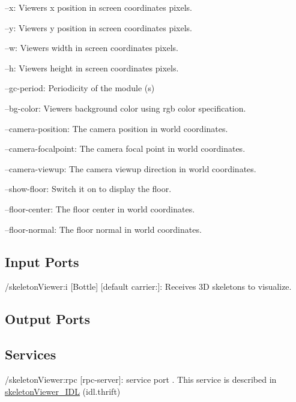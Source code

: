 \begin{DoxyItemize}
\item --x\+: Viewer\textquotesingle{}s x position in screen coordinates pixels.
\item --y\+: Viewer\textquotesingle{}s y position in screen coordinates pixels.
\item --w\+: Viewer\textquotesingle{}s width in screen coordinates pixels.
\item --h\+: Viewer\textquotesingle{}s height in screen coordinates pixels.
\item --gc-\/period\+: Periodicity of the module (s)
\item --bg-\/color\+: Viewer\textquotesingle{}s background color using rgb color specification.
\item --camera-\/position\+: The camera position in world coordinates.
\item --camera-\/focalpoint\+: The camera focal point in world coordinates.
\item --camera-\/viewup\+: The camera viewup direction in world coordinates.
\item --show-\/floor\+: Switch it on to display the floor.
\item --floor-\/center\+: The floor center in world coordinates.
\item --floor-\/normal\+: The floor normal in world coordinates. 
\end{DoxyItemize}\hypertarget{group__skeletonViewer_inputports_sec}{}\subsection{Input Ports}\label{group__skeletonViewer_inputports_sec}

\begin{DoxyItemize}
\item /skeleton\+Viewer\+:i \mbox{[}Bottle\mbox{]} \mbox{[}default carrier\+:\mbox{]}\+: Receives 3D skeletons to visualize.
\end{DoxyItemize}\hypertarget{group__skeletonViewer_outputports_sec}{}\subsection{Output Ports}\label{group__skeletonViewer_outputports_sec}
\hypertarget{group__skeletonViewer_services_sec}{}\subsection{Services}\label{group__skeletonViewer_services_sec}

\begin{DoxyItemize}
\item /skeleton\+Viewer\+:rpc \mbox{[}rpc-\/server\mbox{]}\+: service port . This service is described in \mbox{\hyperlink{classskeletonViewer__IDL}{skeleton\+Viewer\+\_\+\+I\+DL}} (idl.\+thrift) 
\end{DoxyItemize}